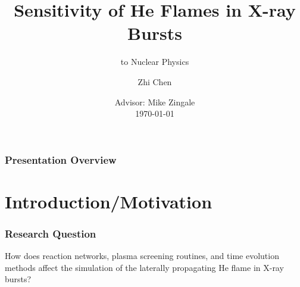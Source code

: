 \documentclass[
	11pt, %
]{beamer}
\title[He Flame Simulation in X-ray Bursts]{Sensitivity of He Flames in X-ray Bursts} %
\subtitle{to Nuclear Physics}%
\author[Zhi Chen]{Zhi Chen} %
\institute[SBU]{Stony Brook University \\ \smallskip \textit{}} %
\date[\today]{Advisor: Mike Zingale \\ \today} %
\begin{document}

\begin{frame}
	\titlepage %
\end{frame}



\begin{frame}
	\frametitle{Presentation Overview} %
	
	\tableofcontents %
\end{frame}


\section{Introduction/Motivation}

\begin{frame}
    \frametitle{Research Question}
    
    \begin{center}
        \large How does reaction networks, plasma screening routines, and time evolution methods affect the simulation of the laterally propagating He flame in X-ray bursts?
    \end{center}
    
\end{frame}
\end{document}
